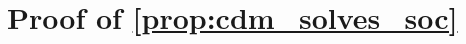 \clearpage
\section{\texorpdfstring{Proof of \cref{prop:cdm_solves_soc}}{Proof of Theorem \ref{prop:cdm_solves_soc}}}
\label{sec:proof_cdm_learn}








